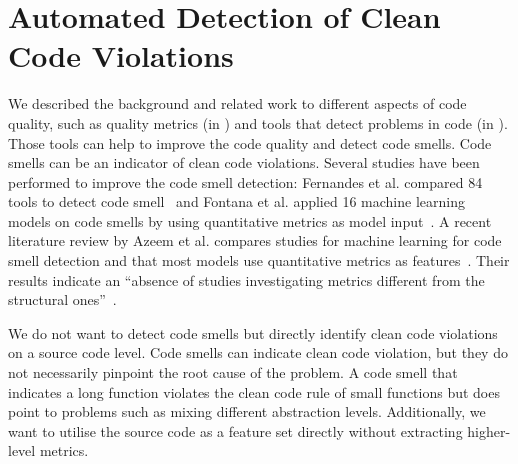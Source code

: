 \section{Automated Detection of Clean Code Violations}
We described the background and related work to different aspects of code quality, such as quality metrics (in ) and tools that detect problems in code (in ). Those tools can help to improve the code quality and detect code smells. Code smells can be an indicator of clean code violations. Several studies have been performed to improve the code smell detection: Fernandes et al. compared 84 tools to detect code smell~\cite{fernandes_review-based_2016} and Fontana et al. applied 16 machine learning models on code smells by using quantitative metrics as model input~\cite{arcelli_fontana_comparing_2016}. A recent literature review by Azeem et al. compares studies for machine learning for code smell detection and that most models use quantitative metrics as features~\cite{azeem_machine_2019}. Their results indicate an \enquote{absence of studies investigating metrics different from the structural
ones}~\cite{azeem_machine_2019}.

We do not want to detect code smells but directly identify clean code violations on a source code level. Code smells can indicate clean code violation, but they do not necessarily pinpoint the root cause of the problem. A code smell that indicates a long function violates the clean code rule of small functions but does point to problems such as mixing different abstraction levels. Additionally, we want to utilise the source code as a feature set directly without extracting higher-level metrics.